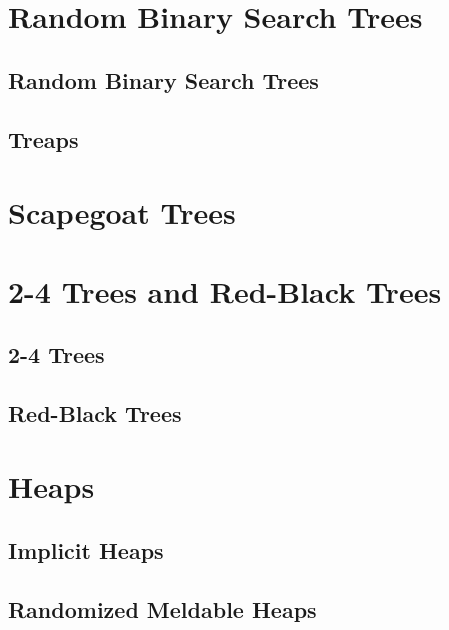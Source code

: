 \documentclass{book}
\begin{document}
\chapter{Random Binary Search Trees}
\section{Random Binary Search Trees}
\section{Treaps}

\chapter{Scapegoat Trees}

\chapter{2-4 Trees and Red-Black Trees}
\section{2-4 Trees}
\section{Red-Black Trees}

\chapter{Heaps}
\section{Implicit Heaps}
\section{Randomized Meldable Heaps}
\end{document}
